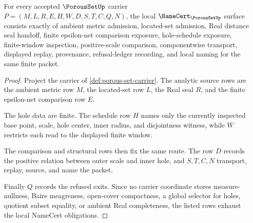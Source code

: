 \begin{theorem}
\label{thm:porous-set-namecert-obligations}
For every accepted $\PorousSetUp$ carrier $P=(M,L,R,E,H,W,D,S,T,C,Q,N)$, the local $\NameCert_{\PorousSetUp}$ surface consists exactly of ambient metric admission, located-set admission, Real distance seal handoff, finite epsilon-net comparison exposure, hole-schedule exposure, finite-window inspection, positive-scale comparison, componentwise transport, displayed replay, provenance, refusal-ledger recording, and local naming for the same finite packet.
\end{theorem}
\begin{proof}
Project the carrier of \autoref{def:porous-set-carrier}. The analytic source rows are the ambient metric row $M$, the located-set row $L$, the Real seal $R$, and the finite epsilon-net comparison row $E$.

The hole data are finite. The schedule row $H$ names only the currently inspected base point, scale, hole center, inner radius, and disjointness witness, while $W$ restricts each read to the displayed finite window.

The comparison and structural rows then fix the same route. The row $D$ records the positive relation between outer scale and inner hole, and $S,T,C,N$ transport, replay, source, and name the packet.

Finally $Q$ records the refused exits. Since no carrier coordinate stores measure-nullness, Baire meagreness, open-cover compactness, a global selector for holes, quotient subset equality, or ambient Real completeness, the listed rows exhaust the local NameCert obligations.
\end{proof}

